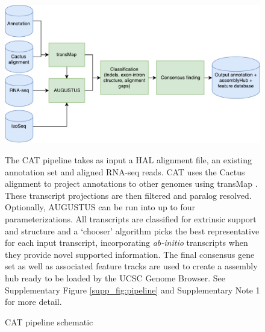 \begin{figure}
\centering
\includegraphics[width=\textwidth,height=\textheight,keepaspectratio]{Figure_1.pdf}
\caption{CAT pipeline schematic}
The CAT pipeline takes as input a HAL alignment file, an existing annotation set and aligned RNA-seq reads. CAT uses the Cactus alignment to project annotations to other genomes using transMap  \citep{stanke2008using}. These transcript projections are then filtered and paralog resolved. Optionally, AUGUSTUS can be run into up to four parameterizations. All transcripts are classified for extrinsic support and structure and a ‘chooser’ algorithm picks the best representative for each input transcript, incorporating \textit{ab-initio} transcripts when they provide novel supported information. The final consensus gene set as well as associated feature tracks are used to create a assembly hub ready to be loaded by the UCSC Genome Browser. See Supplementary Figure \ref{supp_fig:pipeline} and Supplementary Note 1 for more detail.
\label{fig:pipeline}
\end{figure}


